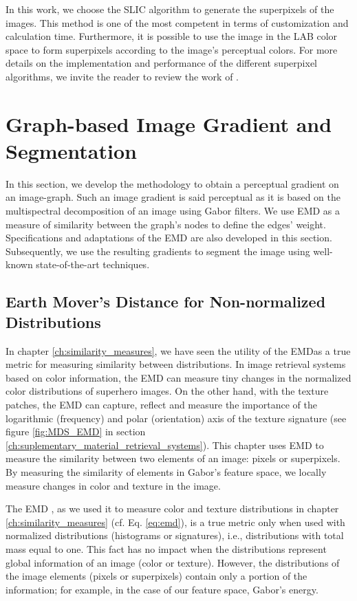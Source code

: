 In this work, we choose the SLIC algorithm to generate the superpixels of the images. This method is one of the most competent in terms of customization and calculation time. Furthermore, it is possible to use the image in the LAB color space to form superpixels according to the image's perceptual colors. For more details on the implementation and performance of the different superpixel algorithms, we invite the reader to review the work of \cite{Wang.Liu.ea:SP:2017}.

\section{Graph-based Image Gradient and Segmentation}

In this section, we develop the methodology to obtain a perceptual gradient on an image-graph. Such an image gradient is said perceptual as it is based on the multispectral decomposition of an image using Gabor filters. We use EMD as a measure of similarity between the graph's nodes to define the edges' weight. Specifications and adaptations of the EMD are also developed in this section. Subsequently, we use the resulting gradients to segment the image using well-known state-of-the-art techniques.  

\subsection{Earth Mover's Distance for Non-normalized Distributions}
In chapter \ref{ch:similarity_measures}, we have seen the utility of the EMDas a true metric for measuring similarity between distributions. In image retrieval systems based on color information, the EMD can measure tiny changes in the normalized color distributions of superhero images. On the other hand, with the texture patches, the EMD can capture, reflect and measure the importance of the logarithmic (frequency) and polar (orientation) axis of the texture signature (see figure \ref{fig:MDS_EMD} in section \ref{ch:suplementary_material_retrieval_systems}). This chapter uses EMD to measure the similarity between two elements of an image: pixels or superpixels. By measuring the similarity of elements in Gabor's feature space, we locally measure changes in color and texture in the image. 

The EMD \citep{Rubner.Tomasi.ea:IJCV:2000} , as we used it to measure color and texture distributions in chapter \ref{ch:similarity_measures} (cf. Eq. \eqref{eq:emd}), is a true metric only when used with normalized distributions (histograms or signatures), i.e., distributions with total mass equal to one. This fact has no impact when the distributions represent global information of an image (color or texture). However, the distributions of the image elements (pixels or superpixels) contain only a portion of the information; for example, in the case of our feature space, Gabor's energy. 

